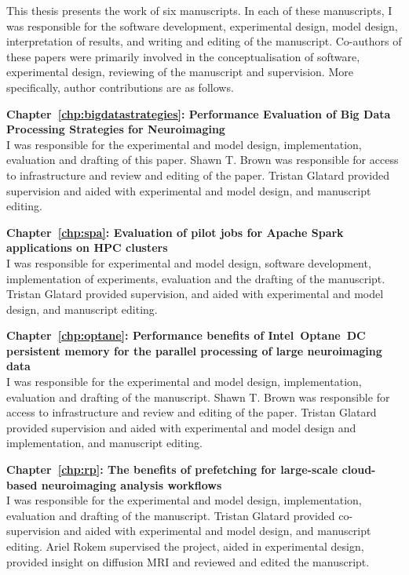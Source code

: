 \begin{contributions}

	This thesis presents the work of six manuscripts.
	In each of these manuscripts, I was responsible for the software development,
	experimental design, model design, interpretation of results, and writing and editing of the manuscript.
	Co-authors of these papers were primarily involved in the conceptualisation of software, experimental design,
	reviewing of the manuscript and supervision. More specifically, author contributions are as follows.


	\textbf{Chapter~\ref{chp:bigdatastrategies}: Performance Evaluation of Big Data Processing Strategies for
Neuroimaging} \\
	I was responsible for the experimental and model design, implementation, evaluation and drafting of this paper.
	Shawn T. Brown was responsible for access to infrastructure and review and editing of the paper.
	Tristan Glatard provided supervision and aided with experimental and model design, and manuscript editing.


	\textbf{Chapter~\ref{chp:spa}: Evaluation of pilot jobs for Apache Spark applications on HPC
clusters} \\
	I was responsible for experimental and model design, software development, implementation of experiments,
	evaluation and the drafting of the manuscript. Tristan Glatard provided supervision, and aided with experimental and model design,
	and manuscript editing.

	\textbf{Chapter~\ref{chp:optane}: Performance benefits of
Intel\textsuperscript{\textregistered}~Optane\texttrademark~DC persistent memory
for the parallel processing of large neuroimaging data} \\
	I was responsible for the experimental and model design, implementation, evaluation and drafting of the manuscript.
	Shawn T. Brown was responsible for access to infrastructure and review and editing of the paper.
	Tristan Glatard provided supervision and aided with experimental and model design and implementation, and manuscript editing.

	\textbf{Chapter~\ref{chp:rp}: The benefits of prefetching for large-scale cloud-based neuroimaging
analysis workflows} \\
	I was responsible for the experimental and model design, implementation, evaluation and drafting of the manuscript.
	Tristan Glatard provided co-supervision and aided with experimental and model design, and manuscript editing.
	Ariel Rokem supervised the project, aided in experimental design, provided insight on diffusion MRI and reviewed and edited the manuscript.


\end{contributions}

